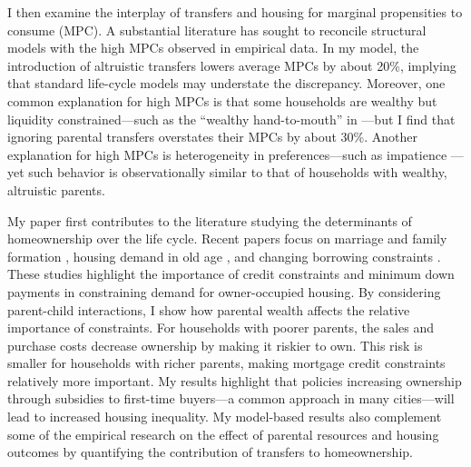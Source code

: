 \documentclass[12pt]{article}
\begin{document}
I then examine the interplay  of transfers and housing for marginal propensities to consume (MPC). A substantial literature has sought to reconcile structural models with the high MPCs observed in empirical data.  In my model, the introduction of altruistic transfers lowers average MPCs by about 20\%, implying that standard life-cycle models may understate the discrepancy.  Moreover, one common explanation for high MPCs is that some households are wealthy but liquidity constrained---such as the ``wealthy hand-to-mouth'' in \cite{kaplan2022marginal}---but I find that ignoring parental transfers overstates their MPCs by about 30\%. Another explanation for high MPCs is heterogeneity in preferences---such as impatience \citep[e.g.,][]{aguiar2024hand}---yet such behavior is observationally similar to that of households with wealthy, altruistic parents.



My paper first contributes to the literature studying the determinants of homeownership over the life cycle. Recent papers focus on marriage and family formation \citep{Fisher2011,Chang2024,Khorunzhina2019}, housing demand in old age \citep{McGee2019,Barczyk2020a}, and changing borrowing constraints \citep{Paz-Pardo2019,Mabille2020}. These studies highlight the importance of credit constraints and minimum down payments in constraining demand for owner-occupied housing. By considering parent-child interactions, I show how parental wealth affects the relative importance of constraints. For households with poorer parents, the sales and purchase costs decrease ownership by making it riskier to own. This risk is smaller for households with richer parents, making mortgage credit constraints relatively more important. My results highlight that policies increasing ownership through subsidies to first-time buyers---a common approach in many cities---will lead to increased housing inequality. My model-based results also complement some of the empirical research on the effect of parental resources and housing outcomes \citep[see e.g.,][ for recent work]{wold2024housing,daysal2023intergenerational,benetton2022dynastic} by quantifying the contribution of transfers to homeownership.
\end{document}
